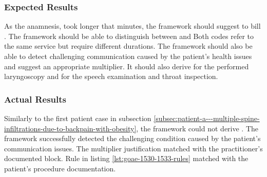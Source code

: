 \subsubsection{Expected Results}
As the anamnesis, took longer that  minutes, the framework should suggest to bill .
The framework should be able to distinguish between  and 
Both codes refer to the same service but require different durations.
The framework should also be able to detect challenging communication caused by the patient's health issues and suggest an appropriate multiplier.
It should also derive  for the performed laryngoscopy and  for the speech examination and throat inspection.

\subsubsection{Actual Results}
Similarly to the first patient case in subsection \ref{subsec:patient-a---multiple-spine-infiltrations-due-to-backpain-with-obesity}, the framework could not derive .
The framework successfully detected the challenging condition caused by the patient's communication issues.
The multiplier justification  matched with the practitioner's documented  block.
Rule  in listing \ref{lst:goae-1530-1533-rules} matched with the patient's  procedure documentation.



